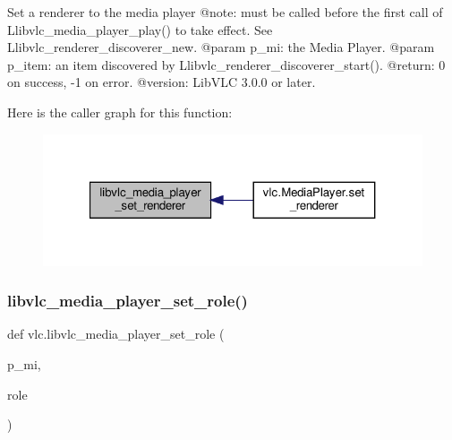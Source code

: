 \begin{DoxyVerb}Set a renderer to the media player
@note: must be called before the first call of L{libvlc_media_player_play}() to
take effect.
See L{libvlc_renderer_discoverer_new}.
@param p_mi: the Media Player.
@param p_item: an item discovered by L{libvlc_renderer_discoverer_start}().
@return: 0 on success, -1 on error.
@version: LibVLC 3.0.0 or later.
\end{DoxyVerb}
 Here is the caller graph for this function\+:
\nopagebreak
\begin{figure}[H]
\begin{center}
\leavevmode
\includegraphics[width=321pt]{namespacevlc_af049b733fbfa570005d2cb436dc7edf1_icgraph}
\end{center}
\end{figure}
\mbox{\label{namespacevlc_a6a98b9503c22b828717b774246b1252d}} 
\subsubsection{\texorpdfstring{libvlc\+\_\+media\+\_\+player\+\_\+set\+\_\+role()}{libvlc\_media\_player\_set\_role()}}
{\footnotesize\ttfamily def vlc.\+libvlc\+\_\+media\+\_\+player\+\_\+set\+\_\+role (\begin{DoxyParamCaption}\item[{}]{p\+\_\+mi,  }\item[{}]{role }\end{DoxyParamCaption})}

